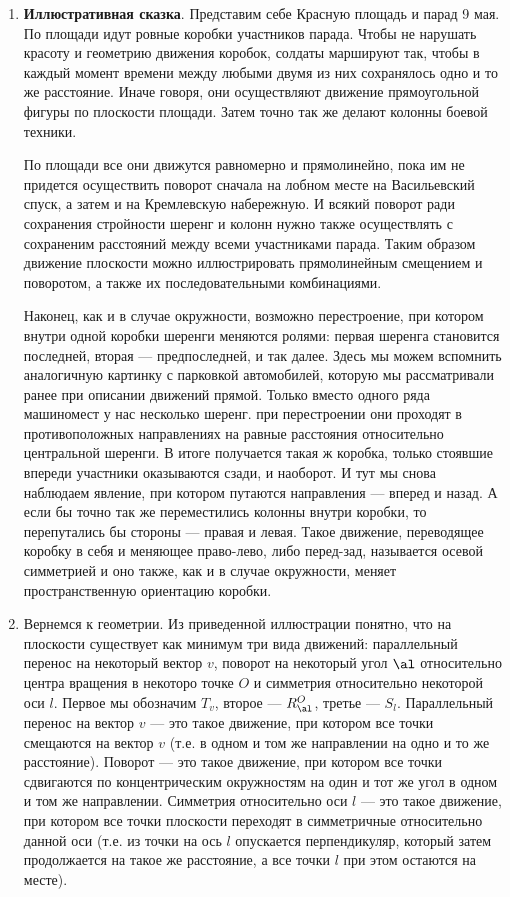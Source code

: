 \begin{enumerate}
\item \textbf{Иллюстративная сказка}. Представим себе Красную площадь и парад 9 мая. По площади идут ровные коробки участников парада. Чтобы не нарушать красоту и геометрию движения коробок, солдаты маршируют так, чтобы в каждый момент времени между любыми двумя из них сохранялось одно и то же расстояние. Иначе говоря, они осуществляют движение прямоугольной фигуры по плоскости площади. Затем точно так же делают колонны боевой техники.

По площади все они движутся равномерно и прямолинейно, пока им не придется осуществить поворот сначала на лобном месте на Васильевский спуск, а затем и на Кремлевскую набережную. И всякий поворот ради сохранения стройности шеренг и колонн нужно также осуществлять с сохраненим расстояний между всеми участниками парада. Таким образом движение плоскости можно иллюстрировать прямолинейным смещением и поворотом, а также их последовательными комбинациями.

Наконец, как и в случае окружности, возможно перестроение, при котором внутри одной коробки шеренги меняются ролями: первая шеренга становится последней, вторая --- предпоследней, и так далее. Здесь мы можем вспомнить аналогичную картинку с парковкой автомобилей, которую мы рассматривали ранее при описании движений прямой. Только вместо одного ряда машиномест у нас несколько шеренг. при перестроении они проходят в противоположных направлениях на равные расстояния относительно центральной шеренги. В итоге получается такая ж коробка, только стоявшие впереди участники оказываются сзади, и наоборот. И тут мы снова наблюдаем явление, при котором путаются направления --- вперед и назад. А если бы точно так же переместились колонны внутри коробки, то перепутались бы стороны --- правая и левая. Такое движение, переводящее коробку в себя и меняющее право-лево, либо перед-зад, называется осевой симметрией и оно также, как и в случае окружности, меняет пространственную ориентацию коробки.

\item Вернемся к геометрии.
Из приведенной иллюстрации понятно, что на плоскости существует как минимум три вида движений: параллельный перенос на некоторый вектор $v$, поворот на некоторый угол $\al$ относительно центра вращения в некоторо точке $O$ и симметрия относительно некоторой оси $l$. Первое мы обозначим $T_v$, второе --- $R^O_\al$, третье --- $S_l$. Параллельный перенос на вектор $v$ --- это такое движение, при котором все точки смещаются на вектор $v$ (т.е. в одном и том же направлении на одно и то же расстояние). Поворот --- это такое движение, при котором все точки сдвигаются по концентрическим окружностям на один и тот же угол в одном и том же направлении. Симметрия относительно оси $l$ --- это такое движение, при котором все точки плоскости переходят в симметричные относительно данной оси (т.е. из точки на ось $l$ опускается перпендикуляр, который затем продолжается на такое же расстояние, а все точки $l$ при этом остаются на месте).


\end{enumerate}
